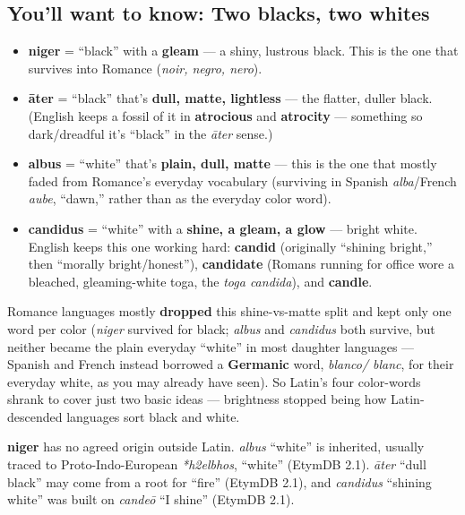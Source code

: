 \subsection*{You'll want to know: Two blacks, two whites}
\begin{itemize}
\raggedright
  \item \textbf{niger} = \textquotedblleft{}black\textquotedblright{} with a \textbf{gleam} — a shiny, lustrous black. This is the one that survives into Romance (\emph{noir, negro, nero}).
  \item \textbf{āter} = \textquotedblleft{}black\textquotedblright{} that's \textbf{dull, matte, lightless} — the flatter, duller black. (English keeps a fossil of it in \textbf{atrocious} and \textbf{atrocity} — something so dark/dreadful it's \textquotedblleft{}black\textquotedblright{} in the \emph{āter} sense.)
  \item \textbf{albus} = \textquotedblleft{}white\textquotedblright{} that's \textbf{plain, dull, matte} — this is the one that mostly faded from Romance's everyday vocabulary (surviving in Spanish \emph{alba}/French \emph{aube}, \textquotedblleft{}dawn,\textquotedblright{} rather than as the everyday color word).
  \item \textbf{candidus} = \textquotedblleft{}white\textquotedblright{} with a \textbf{shine, a gleam, a glow} — bright white. English keeps this one working hard: \textbf{candid} (originally \textquotedblleft{}shining bright,\textquotedblright{} then \textquotedblleft{}morally bright/honest\textquotedblright{}), \textbf{candidate} (Romans running for office wore a bleached, gleaming-white toga, the \emph{toga candida}), and \textbf{candle}.
\end{itemize}

\begin{culture}
Romance languages mostly \textbf{dropped} this shine-vs-matte split and kept only one word per color (\emph{niger} survived for black; \emph{albus} and \emph{candidus} both survive, but neither became the plain everyday \textquotedblleft{}white\textquotedblright{} in most daughter languages — Spanish and French instead borrowed a \textbf{Germanic} word, \emph{blanco/ blanc}, for their everyday white, as you may already have seen). So Latin's four color-words shrank to cover just two basic ideas — brightness stopped being how Latin-descended languages sort black and white.
\end{culture}

\begin{cousinweb}
\textbf{niger} has no agreed origin outside Latin. \emph{albus} \textquotedblleft{}white\textquotedblright{} is inherited, usually traced to Proto-Indo-European \emph{*h2elbhos}, \textquotedblleft{}white\textquotedblright{} (EtymDB 2.1). \emph{āter} \textquotedblleft{}dull black\textquotedblright{} may come from a root for \textquotedblleft{}fire\textquotedblright{} (EtymDB 2.1), and \emph{candidus} \textquotedblleft{}shining white\textquotedblright{} was built on \emph{candeō} \textquotedblleft{}I shine\textquotedblright{} (EtymDB 2.1).
\end{cousinweb}

